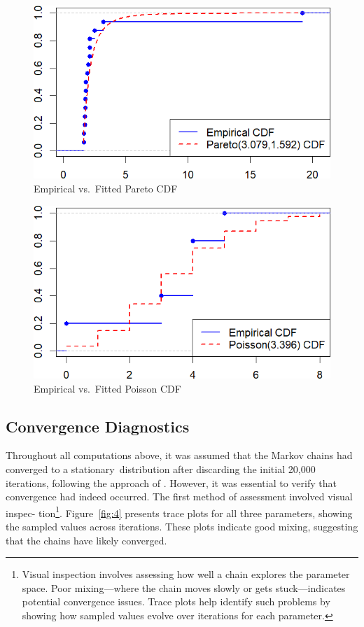 \documentclass{Class/julia}
\begin{document}
\begin{figure}[!ht]
    \centering
    \caption{Empirical vs.\ Fitted Pareto CDF}
    \label{fig:2}
    \includegraphics[width=.5\textwidth]{rytgaard1990/empirical_vs_pareto.png}
\end{figure}

\begin{figure}[!ht]
    \centering
    \caption{Empirical vs.\ Fitted Poisson CDF}
    \label{fig:3}
    \includegraphics[width=.5\textwidth]{rytgaard1990/empirical_vs_poisson.png}
\end{figure}

\subsection{Convergence Diagnostics}

Throughout all computations above, it was assumed that the Markov chains had converged to a stationary~distribution after discarding the initial 20,000 iterations, following the approach of \citet{dudley2006bayesian}. However, it was essential to verify that convergence had indeed occurred. The first method of assessment involved visual inspec- tion\footnote{Visual inspection involves assessing how well a chain explores the parameter space. Poor mixing—where the chain moves slowly or gets stuck—indicates potential convergence issues. Trace plots help identify such problems by showing how sampled values evolve over iterations for each parameter.}. Figure~\ref{fig:4} presents trace plots for all three parameters, showing the sampled values across iterations. These plots indicate good mixing, suggesting that the chains have likely converged.
\end{document}
